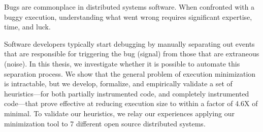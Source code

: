 
%

Bugs are commonplace in distributed systems software. When confronted with a buggy execution,
understanding what went wrong requires significant expertise, time, and luck.

Software developers typically
start debugging by manually separating out events that are responsible for triggering the bug (signal) from those that are extraneous (noise).
In this thesis, we investigate whether it is possible to automate this separation process. We show that the general problem of execution
minimization is intractable, but we develop, formalize, and
empirically validate a set of heuristics---for both partially instrumented code, and completely instrumented code---that prove effective at
reducing execution size to within a factor of 4.6X of minimal.
To validate our heuristics, we relay our experiences applying our minimization tool to 7 different open source distributed systems.
